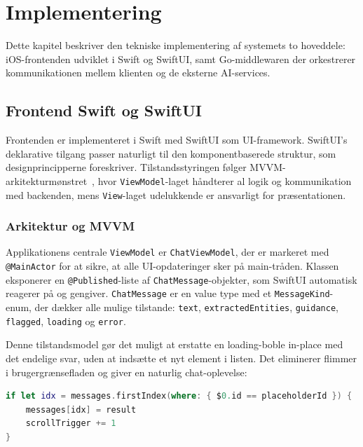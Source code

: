 \chapter{Implementering}
\label{chap:implementation}

Dette kapitel beskriver den tekniske implementering af systemets to hoveddele: iOS-frontenden udviklet i Swift og SwiftUI, samt Go-middlewaren der orkestrerer kommunikationen mellem klienten og de eksterne AI-services.

\section{Frontend Swift og SwiftUI}
\label{sec:frontend}

Frontenden er implementeret i Swift med SwiftUI som UI-framework. SwiftUI's deklarative tilgang passer naturligt til den komponentbaserede struktur, som designprincipperne foreskriver. Tilstandsstyringen følger MVVM-arkitekturmønstret~\cite{mvvm}, hvor \texttt{ViewModel}-laget håndterer al logik og kommunikation med backenden, mens \texttt{View}-laget udelukkende er ansvarligt for præsentationen.

\subsection{Arkitektur og MVVM}
\label{subsec:mvvm}

Applikationens centrale \texttt{ViewModel} er \texttt{ChatViewModel}, der er markeret med \texttt{@MainActor} for at sikre, at alle UI-opdateringer sker på main-tråden. Klassen eksponerer en \texttt{@Published}-liste af \texttt{ChatMessage}-objekter, som SwiftUI automatisk reagerer på og gengiver. \texttt{ChatMessage} er en value type med et \texttt{MessageKind}-enum, der dækker alle mulige tilstande: \texttt{text}, \texttt{extractedEntities}, \texttt{guidance}, \texttt{flagged}, \texttt{loading} og \texttt{error}.

Denne tilstandsmodel gør det muligt at erstatte en loading-boble in-place med det endelige svar, uden at indsætte et nyt element i listen. Det eliminerer flimmer i brugergrænsefladen og giver en naturlig chat-oplevelse:

\begin{lstlisting}[language=Swift, caption={In-place erstatning af loading-besked i ChatViewModel}]
if let idx = messages.firstIndex(where: { $0.id == placeholderId }) {
    messages[idx] = result
    scrollTrigger += 1
}
\end{lstlisting}

